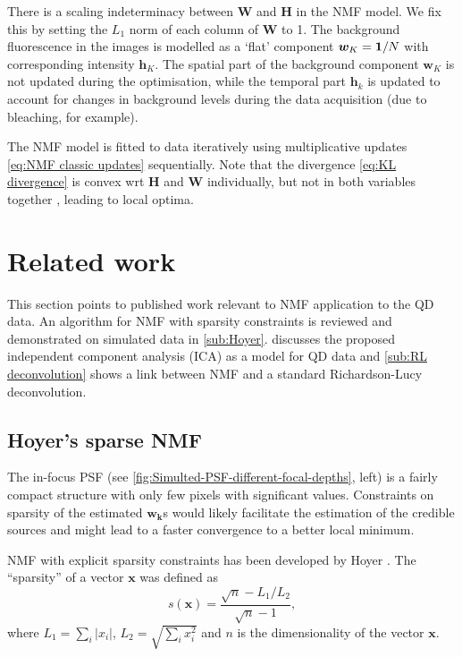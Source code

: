 There is a scaling indeterminacy between $\bm{W}$ and $\bm{H}$ in the NMF model. We fix this by setting the $L_1$ norm of each column of $\bm{W}$ to 1. The background fluorescence in the images is modelled as a `flat' component $\bm{w}_K = \mathbf{1}/N$ with corresponding intensity $\bm{h}_K$. The spatial part of the background component $\bm{w}_K$ is not updated during the optimisation, while the temporal part $\bm{h}_k$ is updated to account for changes in background levels during the data acquisition (due to bleaching, for example).

The NMF model is fitted to data iteratively using multiplicative updates \autoref{eq:NMF classic updates} sequentially. Note that the divergence \autoref{eq:KL divergence} is convex wrt $\bm{H}$ and $\bm{W}$ individually, but not in both variables together \cite{Lee2001}, leading to local optima.


\clearpage
\section{Related work \label{sec:NMF related}}
This section points to published work relevant to NMF application to the QD data. An algorithm for NMF with sparsity constraints is reviewed and demonstrated on simulated data in \autoref{sub:Hoyer}.  discusses the proposed independent component analysis (ICA) as a model for QD data and \autoref{sub:RL deconvolution} shows a link between NMF and a standard Richardson-Lucy deconvolution.

\subsection{Hoyer's sparse NMF \label{sub:Hoyer}}
The in-focus PSF (see \autoref{fig:Simulted-PSF-different-focal-depths}, left) is a fairly compact structure with only few pixels with significant values. Constraints on sparsity of the estimated $\bm{w_k}$s would likely facilitate the estimation of the credible sources and might lead to a faster convergence to a better local minimum. 


NMF with explicit sparsity constraints has been developed by Hoyer \cite{Hoyer2004}. The ``sparsity'' of a vector $\bm{x}$ was defined as 
%
\begin{equation}
	s(\bm{x})=\frac{\sqrt{n}-L_{1}/L_{2}}{\sqrt{n}-1},
	\label{eq:Hoyers sparsity}
\end{equation}
%
where $L_1=\sum_i|x_i|$, $L_2=\sqrt{\sum_i x^2_i}$ and $n$ is the dimensionality of the vector $\bm{x}$.

